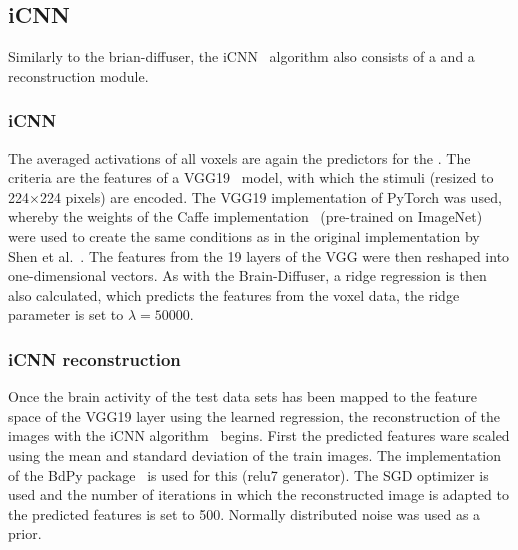\subsection{iCNN}
Similarly to the brian-diffuser, the iCNN~\cite{shenDeepImageReconstruction2019} algorithm also consists of a  and a reconstruction module. 
\subsubsection{iCNN }
The averaged activations of all voxels are again the predictors for the . The criteria are the features of a VGG19~\cite{simonyanVeryDeepConvolutional2014} model, with which the stimuli (resized to 224$\times$224 pixels) are encoded. The VGG19 implementation of PyTorch was used, whereby the weights of the Caffe implementation~\cite{ModelZoo} (pre-trained on ImageNet) were used to create the same conditions as in the original implementation by Shen et al.~\cite{shenDeepImageReconstruction2019}. The features from the 19 layers of the VGG were then reshaped into one-dimensional vectors. As with the Brain-Diffuser, a ridge regression is then also calculated, which predicts the features from the voxel data, the ridge parameter is set to $\lambda=50000$.

\subsubsection{iCNN reconstruction}
Once the brain activity of the test data sets has been mapped to the feature space of the VGG19 layer using the learned regression, the reconstruction of the images with the iCNN algorithm~\cite{shenDeepImageReconstruction2019} begins. First the predicted features ware scaled using the mean and standard deviation of the train images. The implementation of the BdPy package~\cite{KamitaniLabBdpy2024} is used for this (relu7 generator). The SGD optimizer is used and the number of iterations in which the reconstructed image is adapted to the predicted features is set to 500. Normally distributed noise was used as a prior.


